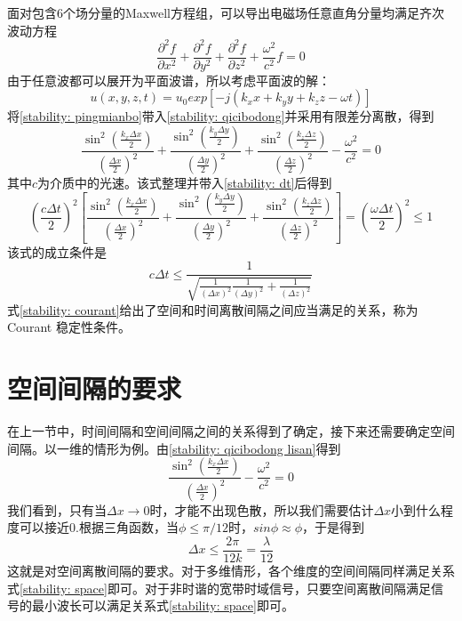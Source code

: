 面对包含6个场分量的Maxwell方程组，可以导出电磁场任意直角分量均满足齐次波动方程
\begin{equation}\label{stability: qicibodong}
\frac{\partial^2 f}{\partial x^2}+\frac{\partial^2 f}{\partial y^2}+\frac{\partial^2 f}{\partial z^2}+\frac{\omega^2}{c^2}f=0
\end{equation}
由于任意波都可以展开为平面波谱，所以考虑平面波的解：
\begin{equation}\label{stability: pingmianbo}
u(x,y,z,t)=u_0 exp[-j(k_x x+k_y y+k_z z-\omega t)]
\end{equation}
将\eqref{stability: pingmianbo}带入\eqref{stability: qicibodong}并采用有限差分离散，得到
\begin{equation}\label{stability: qicibodong lisan}
\frac{\sin^2 \left( \frac{k_x\Delta x}{2} \right)}{\left(\frac{\Delta x}{2}\right)^2}+
\frac{\sin^2 \left( \frac{k_y\Delta y}{2} \right)}{\left(\frac{\Delta y}{2}\right)^2}+
\frac{\sin^2 \left( \frac{k_z\Delta z}{2} \right)}{\left(\frac{\Delta z}{2}\right)^2}-
\frac{\omega^2}{c^2}=0
\end{equation}
其中$c$为介质中的光速。该式整理并带入\eqref{stability: dt}后得到
\begin{equation}
\left(\frac{c\Delta t}{2}\right)^2
\left[
\frac{\sin^2 \left( \frac{k_x\Delta x}{2} \right)}{\left(\frac{\Delta x}{2}\right)^2}+
\frac{\sin^2 \left( \frac{k_y\Delta y}{2} \right)}{\left(\frac{\Delta y}{2}\right)^2}+
\frac{\sin^2 \left( \frac{k_z\Delta z}{2} \right)}{\left(\frac{\Delta z}{2}\right)^2}
\right]=
\left(\frac{\omega\Delta t}{2}\right)^2\leqslant 1
\end{equation}
该式的成立条件是
\begin{equation}\label{stability: courant}
c\Delta t\leqslant
\frac{1}{
	\sqrt{\frac{1}{(\Delta x)^2}\frac{1}{(\Delta y)^2}+\frac{1}{(\Delta z)^2}}
	}
\end{equation}
式\eqref{stability: courant}给出了空间和时间离散间隔之间应当满足的关系，称为 Courant 稳定性条件。

\section{空间间隔的要求}
在上一节中，时间间隔和空间间隔之间的关系得到了确定，接下来还需要确定空间间隔。以一维的情形为例。由\eqref{stability: qicibodong lisan}得到
\begin{equation}
\frac{\sin^2 \left( \frac{k_x\Delta x}{2} \right)}{\left(\frac{\Delta x}{2}\right)^2}-
\frac{\omega^2}{c^2}=0
\end{equation}
我们看到，只有当$\Delta x\rightarrow 0$时，才能不出现色散，所以我们需要估计$\Delta x$小到什么程度可以接近0.根据三角函数，当$\phi\leqslant \pi/12$时，$sin\phi\approx\phi$，于是得到
\begin{equation}\label{stability: space}
	\Delta x\leqslant \frac{2\pi}{12k}=\frac{\lambda}{12}
\end{equation}
这就是对空间离散间隔的要求。对于多维情形，各个维度的空间间隔同样满足关系式\eqref{stability: space}即可。对于非时谐的宽带时域信号，只要空间离散间隔满足信号的最小波长可以满足关系式\eqref{stability: space}即可。


